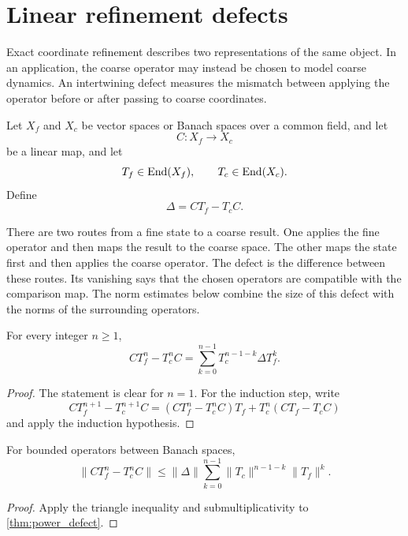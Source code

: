 \section{Linear refinement defects}\label{sec:defects}

Exact coordinate refinement describes two representations of the same object. In an application, the coarse operator may instead be chosen to model coarse dynamics. An intertwining defect measures the mismatch between applying the operator before or after passing to coarse coordinates.

Let $X_f$ and $X_c$ be vector spaces or Banach spaces over a common field, and let
\[
C:X_f\longrightarrow X_c
\]
be a linear map,
and let
\[
T_f\in\operatorname{End}(X_f),
\qquad
T_c\in\operatorname{End}(X_c).
\]
Define
\[
\Delta=CT_f-T_cC.
\]

\begin{keyidea}
There are two routes from a fine state to a coarse result. One applies the fine operator and then maps the result to the coarse space. The other maps the state first and then applies the coarse operator. The defect is the difference between these routes. Its vanishing says that the chosen operators are compatible with the comparison map. The norm estimates below combine the size of this defect with the norms of the surrounding operators.
\end{keyidea}

\begin{theorem}\label{thm:power_defect}\label{thm:power-defect}
For every integer $n\geq1$,
\[
CT_f^n-T_c^nC
=
\sum_{k=0}^{n-1}T_c^{n-1-k}\Delta T_f^k.
\]
\end{theorem}

\begin{proof}
The statement is clear for $n=1$.  For the induction step, write
\[
CT_f^{n+1}-T_c^{n+1}C
=
(CT_f^n-T_c^nC)T_f+T_c^n(CT_f-T_cC)
\]
and apply the induction hypothesis.
\end{proof}

\begin{corollary}\label{cor:power_norm}
For bounded operators between Banach spaces,
\[
\|CT_f^n-T_c^nC\|
\leq
\|\Delta\|
\sum_{k=0}^{n-1}
\|T_c\|^{n-1-k}\|T_f\|^k.
\]
\end{corollary}

\begin{proof}
Apply the triangle inequality and submultiplicativity to \cref{thm:power_defect}.
\end{proof}

